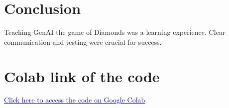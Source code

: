 \documentclass[12pt]{article}
\begin{document}
\section{\textcolor{myblue}{Conclusion}}
Teaching GenAI the game of Diamonds was a learning experience. Clear communication and testing were crucial for success.

\section{\textcolor{myblue}{Colab link of the code}}
\href{https://colab.research.google.com/drive/1GwxtrEMcMhUV_WJdy52zgq2ugOzwO8u4?usp=sharing}{\textcolor{blue}{Click here to access the code on Google Colab}}
\end{document}
